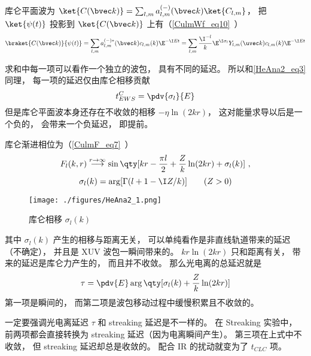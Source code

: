 库仑平面波为 $\ket{C(\bvec k)} = \sum_{l,m} a_{l,m}^{(-)}(\bvec k) \ket{C_{l,m}}$， 把 $\ket{\psi(t)}$ 投影到 $\ket{C(\bvec k)}$ 上有（\autoref{CulmWf_eq10}~）
\begin{equation}
\braket{C(\bvec k)}{\psi(t)} = \sum_{l,m} a_{l,m}^{(-)*}(\bvec k) c_{l,m}(k) \E^{-\I E t} 
= \sum_{l,m} \frac{\I^{-l}}{k} \E^{\I\sigma_l} Y_{l,m} (\uvec k) c_{l,m}(k) \E^{-\I E t}
\end{equation}

求和中每一项可以看作一个独立的波包， 具有不同的延迟。 所以和\autoref{HeAna2_eq3} 同理， 每一项的延迟仅由库仑相移贡献
\begin{equation}
t_{EWS}^C = \pdv{\sigma_l}{E}
\end{equation}
但是库仑平面波本身还存在不收敛的相移 $-\eta\ln (2kr)$， 这对能量求导以后是一个负的， 会带来一个负延迟， 即提前。

库仑渐进相位为（\autoref{CulmF_eq7}~）
\begin{equation}
F_l(k, r) \overset{r\to \infty}{\longrightarrow} \sin\qty[kr - \frac{\pi l}{2} + \frac{Z}{k}\ln(2kr) + \sigma_l(k)]~, %
\end{equation}
\begin{equation}
\sigma_l(k) = \arg[\Gamma(l+1-\I Z/k)] \qquad (Z > 0)
\end{equation}
\begin{figure}[ht]
\centering
\texttt{[image: ./figures/HeAna2\_1.png]}
\caption{库仑相移 $\sigma_l(k)$} \label{HeAna2_fig1}
\end{figure}
其中 $\sigma_l(k)$ 产生的相移与距离无关， 可以单纯看作是非直线轨道带来的延迟（不确定）， 并且是 XUV 波包一瞬间带来的。 $kr\ln(2kr)$ 只和距离有关， 带来的延迟是库仑力产生的， 而且并不收敛。 那么光电离的总延迟就是
\begin{equation}\label{HeAna2_eq5}
\tau = \pdv{E} \arg\qty[\sigma_l(k) + \frac{Z}{k}\ln(2kr)] %
\end{equation}
第一项是瞬间的， 而第二项是波包移动过程中缓慢积累且不收敛的。

一定要强调光电离延迟 $\tau$ 和 streaking 延迟是不一样的。 在 Streaking 实验中， 前两项都会直接转换为 streaking 延迟（因为电离瞬间产生）。 第三项在上式中不收敛， 但 streaking 延迟却总是收敛的。 配合 IR 的扰动就变为了 $t_{CLC}$ 项。

